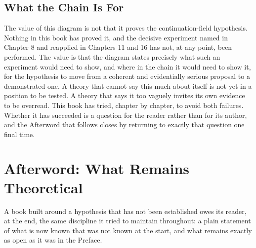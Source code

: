 \documentclass[11pt]{book}
\begin{document}
\section*{What the Chain Is For}

The value of this diagram is not that it proves the continuation-field hypothesis. Nothing in this book has proved it, and the decisive experiment named in Chapter 8 and reapplied in Chapters 11 and 16 has not, at any point, been performed. The value is that the diagram states precisely what such an experiment would need to show, and where in the chain it would need to show it, for the hypothesis to move from a coherent and evidentially serious proposal to a demonstrated one. A theory that cannot say this much about itself is not yet in a position to be tested. A theory that says it too vaguely invites its own evidence to be overread. This book has tried, chapter by chapter, to avoid both failures. Whether it has succeeded is a question for the reader rather than for its author, and the Afterword that follows closes by returning to exactly that question one final time.

\backmatter

\chapter*{Afterword: What Remains Theoretical}

A book built around a hypothesis that has not been established owes its reader, at the end, the same discipline it tried to maintain throughout: a plain statement of what is now known that was not known at the start, and what remains exactly as open as it was in the Preface.
\end{document}
